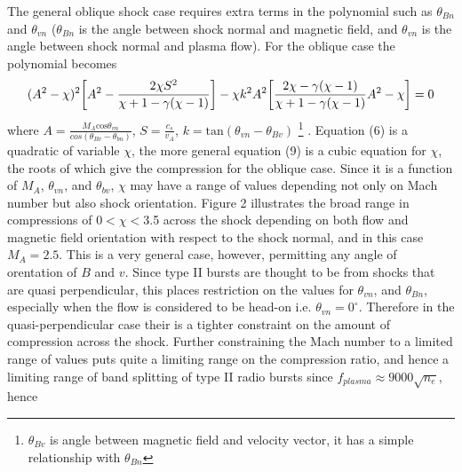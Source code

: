 The general oblique shock case requires extra terms in the polynomial such as $\theta_{Bn}$ and $\theta_{vn}$ ($\theta_{Bn}$ is the angle between shock normal and magnetic field, and $\theta_{vn}$ is the angle between shock normal and plasma flow). For the oblique case the polynomial becomes
\begin{equation}
(A^2-\chi)^2\bigg[A^2 - \frac{2\chi S^2}{\chi+1-\gamma(\chi-1)}\bigg]\\
-\chi k^2A^2\bigg[\frac{2\chi - \gamma(\chi-1)}{\chi+1- \gamma(\chi-1)}A^2 -\chi\bigg]=0
\end{equation}
where $A=\frac{M_A\mathrm{cos}\theta_{vn}}{cos(\theta_{Bv}-\theta_{bn})}$,  $S=\frac{c_s}{v_A}$, $k=\mathrm{tan}(\theta_{vn}-\theta_{Bv})$ \footnote{$\theta_{Bv}$ is angle between magnetic field and velocity vector, it has a simple relationship with $\theta_{Bn}$} 
\citep{kabin2001}. Equation (6) is a quadratic of variable $\chi$, the more general equation (9) is a cubic equation for $\chi$, the roots of which give the compression for the oblique case. Since it is a function of $M_A$, $\theta_{vn}$, and $\theta_{bv}$, $\chi$ may have a range of values depending not only on Mach number but also shock orientation. Figure 2 illustrates the broad range in compressions of 0$<\chi<$3.5 across the shock depending on both flow and magnetic field orientation with respect to the shock normal, and in this case $M_A=2.5$. 
This is a very general case, however, permitting any angle of orentation of $B$ and $v$. Since type II bursts are thought to be from shocks that are quasi perpendicular, this places restriction on the values for $\theta_{vn}$, and $\theta_{Bn}$, especially when the flow is considered to be head-on i.e. $\theta_{vn}=0^{\circ}$. Therefore in the quasi-perpendicular case their is a tighter constraint on the amount of compression across the shock. Further constraining the Mach number to a limited range of values puts quite a limiting range on the compression ratio, and hence a limiting range of band splitting of type II radio bursts since $f_{plasma}\approx9000\sqrt{n_e}$, hence

